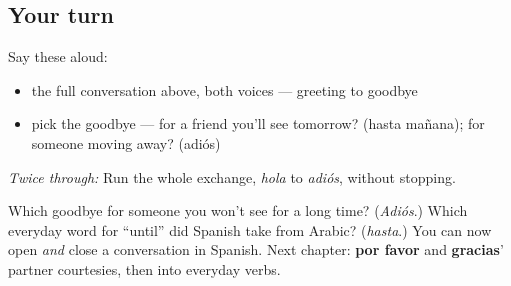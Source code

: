 \subsection*{Your turn}
Say these aloud:

\begin{itemize}
\raggedright
  \item the full conversation above, both voices — greeting to goodbye
  \item pick the goodbye — for a friend you'll see tomorrow? (hasta mañana); for someone moving away? (adiós)
\end{itemize}

\emph{Twice through:} Run the whole exchange, \emph{hola} to \emph{adiós}, without stopping.

\begin{tcolorbox}[breakable,colback=teal!4,colframe=teal!35!black,title={Before you move on}]
Which goodbye for someone you won't see for a long time? (\emph{Adiós}.) Which everyday word for \textquotedblleft{}until\textquotedblright{} did Spanish take from Arabic? (\emph{hasta}.) You can now open \emph{and} close a conversation in Spanish. Next chapter: \textbf{por favor} and \textbf{gracias}' partner courtesies, then into everyday verbs.
\end{tcolorbox}
